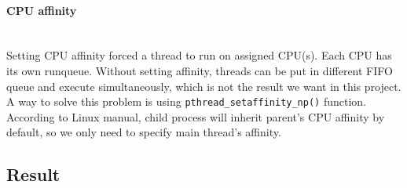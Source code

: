 \documentclass[12pt]{article}
\begin{document}
\paragraph{CPU affinity}\mbox{}\\
Setting CPU affinity forced a thread to run on assigned CPU(s). Each CPU has its own runqueue. Without setting affinity, threads can be put in different FIFO queue and execute simultaneously, which is not the result we want in this project. A way to solve this problem is using \verb|pthread_setaffinity_np()| function. According to Linux manual, child process will inherit parent's CPU affinity by default, so we only need to specify main thread's affinity. 
 
\subsection*{Result}
\end{document}
